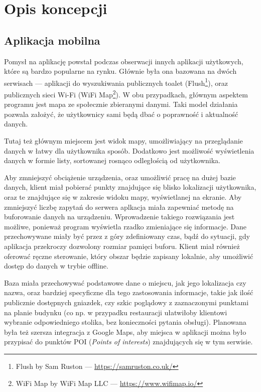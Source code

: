 \documentclass[polish,polish,a4paper,12pt]{article}
\let\sectioncmd\section
\renewcommand{\section}{\clearpage\sectioncmd}
\begin{document}
\section{Opis koncepcji}\label{concept}
	\subsection{Aplikacja mobilna}

	Pomysł na aplikację powstał podczas obserwacji innych aplikacji użytkowych, które są bardzo popularne na rynku. Głównie była ona bazowana na dwóch serwisach — aplikacji do wyszukiwania publicznych toalet (Flush\footnote{Flush by Sam Ruston — \url{https://samruston.co.uk/}}), oraz publicznych sieci Wi-Fi (WiFi Map\footnote{WiFi Map by WiFi Map LLC — \url{https://www.wifimap.io/}}). W obu przypadkach, głównym aspektem programu jest mapa ze społecznie zbieranymi danymi. Taki model działania pozwala założyć, że użytkownicy sami będą dbać o poprawność i aktualność danych.

	Tutaj też głównym miejscem jest widok mapy, umożliwiający na przeglądanie danych w łatwy dla użytkownika sposób. Dodatkowo jest możliwość wyświetlenia danych w formie listy, sortowanej rosnąco odległością od użytkownika.

	Aby zmniejszyć obciążenie urządzenia, oraz umożliwić pracę na dużej bazie danych, klient miał pobierać punkty znajdujące się blisko lokalizacji użytkownika, oraz te znajdujące się w zakresie widoku mapy, wyświetlanej na ekranie. Aby zmniejszyć liczbę zapytań do serwera aplkacja miała zapewniać metodę na buforowanie danych na urządzeniu. Wprowadzenie takiego rozwiązania jest możliwe, ponieważ program wyświetla rzadko zmieniające się informacje. Dane przechowywane miały być przez z góry zdefiniowany czas, bądź do sytuacji, gdy aplikacja przekroczy dozwolony rozmiar pamięci buforu. Klient miał również oferować ręczne sterowanie, który obszar będzie zapisany lokalnie, aby umożliwić dostęp do danych w trybie offline.

	Baza miała przechowywać podstawowe dane o miejscu, jak jego lokalizacja czy nazwa, oraz bardziej specyficzne dla tego zastosowania informacje, takie jak ilość publicznie dostępnych gniazdek, czy szkic poglądowy z zaznaczonymi punktami na planie budynku (co np. w przypadku restauracji ułatwiłoby klientowi wybranie odpowiedniego stolika, bez konieczności pytania obsługi). Planowana była też szersza integracja z Google Maps, aby miejsca w aplikacji można było przypisać do punktów POI (\textit{Points of interests}) znajdujących się w tym serwisie.
\end{document}
